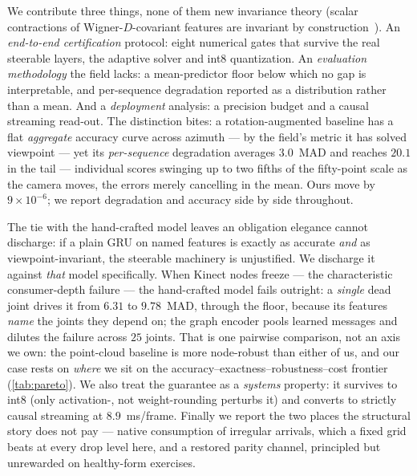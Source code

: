 \documentclass[10pt,twocolumn,letterpaper]{article}
\begin{document}
We contribute three things, none of them new invariance theory
(scalar contractions of Wigner-$D$-covariant features are invariant by
construction~\cite{geiger2022e3nn,thomas2018tfn,fuchs2020se3transformer}). An \emph{end-to-end
certification} protocol: eight numerical gates that survive the real steerable layers, the adaptive
solver and int8 quantization. An \emph{evaluation methodology} the field lacks: a mean-predictor floor
below which no gap is interpretable, and per-sequence degradation reported as a distribution rather
than a mean. And a \emph{deployment} analysis: a precision budget and a causal streaming read-out.
The distinction bites: a rotation-augmented baseline has a flat
\emph{aggregate} accuracy curve across azimuth --- by the field's metric it has solved viewpoint --- yet
its \emph{per-sequence} degradation averages $3.0$~MAD and reaches $20.1$ in the tail --- individual
scores swinging up to two fifths of the fifty-point scale as the camera moves, the errors merely
cancelling in the mean. Ours move by $9\times10^{-6}$; we report degradation and accuracy side by side
throughout.

The tie with the hand-crafted model leaves an obligation elegance cannot discharge: if a plain GRU on
named features is exactly as accurate \emph{and} as viewpoint-invariant, the steerable machinery is
unjustified. We discharge it against \emph{that} model specifically. When Kinect nodes freeze --- the
characteristic consumer-depth failure --- the hand-crafted model fails outright: a \emph{single} dead
joint drives it from $6.31$ to $9.78$~MAD, through the floor, because its features \emph{name} the
joints they depend on; the graph encoder pools learned messages and dilutes the failure across $25$
joints. That is one pairwise comparison, not an axis we own: the point-cloud baseline is more
node-robust than either of us, and our case rests on \emph{where} we sit on the
accuracy--exactness--robustness--cost frontier (\cref{tab:pareto}). We also treat
the guarantee as a \emph{systems} property: it survives to int8 (only activation-, not weight-rounding
perturbs it) and converts to strictly causal streaming at $8.9$~ms/frame. Finally we report the two places the structural story does not pay --- native consumption of irregular
arrivals, which a fixed grid beats at every drop level here, and a restored parity channel, principled
but unrewarded on healthy-form exercises.
\end{document}
